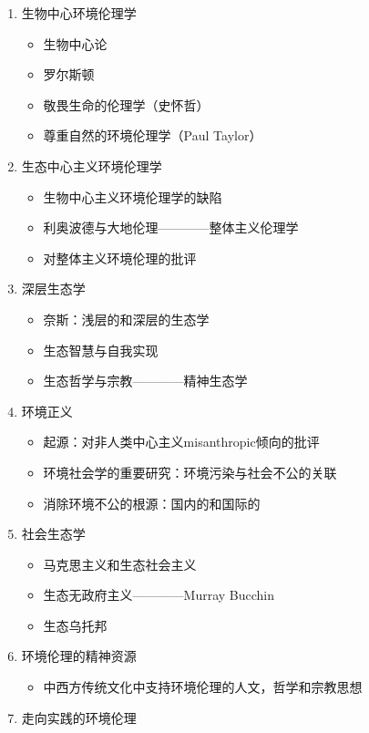 \documentclass{ctexart}
\begin{document}
\begin{enumerate}
\begin{itemize}
        \item Singer和动物解放：功利主义和道德眼神主义
        \item 动物权利论：义务论，天赋价值和生命主体
        \item 动物解放与素食主义
        \item 动物解放与环境伦理学的矛盾
    \end{itemize}
    \item 生物中心环境伦理学
    \begin{itemize}
        \item 生物中心论
        \item 罗尔斯顿
        \item 敬畏生命的伦理学（史怀哲）
        \item 尊重自然的环境伦理学（Paul Taylor）
    \end{itemize}
    \item 生态中心主义环境伦理学
    \begin{itemize}
        \item 生物中心主义环境伦理学的缺陷
        \item 利奥波德与大地伦理————整体主义伦理学
        \item 对整体主义环境伦理的批评
    \end{itemize}
    \item 深层生态学
    \begin{itemize}
        \item 奈斯：浅层的和深层的生态学
        \item 生态智慧与自我实现
        \item 生态哲学与宗教————精神生态学
    \end{itemize}
    \item 环境正义
    \begin{itemize}
        \item 起源：对非人类中心主义misanthropic倾向的批评
        \item 环境社会学的重要研究：环境污染与社会不公的关联
        \item 消除环境不公的根源：国内的和国际的
    \end{itemize}
    \item 社会生态学
    \begin{itemize}
        \item 马克思主义和生态社会主义
        \item 生态无政府主义————Murray Bucchin
        \item 生态乌托邦
    \end{itemize}
    \item 环境伦理的精神资源
    \begin{itemize}
        \item 中西方传统文化中支持环境伦理的人文，哲学和宗教思想
    \end{itemize}
    \item 走向实践的环境伦理
\end{enumerate}
\end{document}
